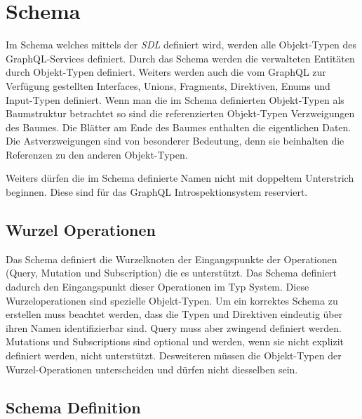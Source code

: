\section{Schema}
Im Schema welches mittels der \textit{SDL} definiert wird, werden alle Objekt-Typen des GraphQL-Services definiert.
Durch das Schema werden die verwalteten Entitäten durch Objekt-Typen definiert.
Weiters werden auch die vom GraphQL zur Verfügung gestellten Interfaces, Unions, Fragments, Direktiven, Enums und Input-Typen definiert.
Wenn man die im Schema definierten Objekt-Typen als Baumstruktur betrachtet so sind die referenzierten Objekt-Typen Verzweigungen des Baumes.
Die Blätter am Ende des Baumes enthalten die eigentlichen Daten.
Die Astverzweigungen sind von besonderer Bedeutung, denn sie beinhalten die Referenzen zu den anderen Objekt-Typen.
\cite[S.60]{kress2020graphql}

Weiters dürfen die im Schema definierte Namen nicht mit doppeltem Unterstrich beginnen.
Diese sind für das GraphQL Introspektionsystem reserviert.
\cite[Abs. 3.3]{graphqlOnline}

\subsection{Wurzel Operationen}
Das Schema definiert die Wurzelknoten der Eingangspunkte der Operationen (Query, Mutation und Subscription) die es unterstützt.
Das Schema definiert dadurch den Eingangspunkt dieser Operationen im Typ System.
Diese Wurzeloperationen sind spezielle Objekt-Typen.
Um ein korrektes Schema zu erstellen muss beachtet werden, dass die Typen und Direktiven eindeutig über ihren Namen identifizierbar sind.
Query muss aber zwingend definiert werden. Mutations und Subscriptions sind optional und werden, wenn sie nicht explizit definiert werden, nicht unterstützt.
Desweiteren müssen die Objekt-Typen der Wurzel-Operationen unterscheiden und dürfen nicht diesselben sein. 
\newline


\subsection{Schema Definition}


